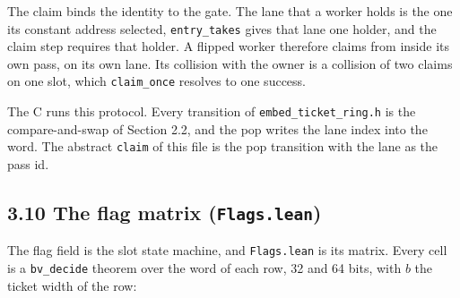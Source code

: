 The claim binds the identity to the gate. The lane that a worker holds is the one its constant address selected, \texttt{entry\_\allowbreak{}takes} gives that lane one holder, and the claim step requires that holder. A flipped worker therefore claims from inside its own pass, on its own lane. Its collision with the owner is a collision of two claims on one slot, which \texttt{claim\_\allowbreak{}once} resolves to one success.

The C runs this protocol. Every transition of \texttt{embed\_\allowbreak{}ticket\_\allowbreak{}ring.\allowbreak{}h} is the compare-and-swap of Section 2.2, and the pop writes the lane index into the word. The abstract \texttt{claim} of this file is the pop transition with the lane as the pass id.

\subsection{\texorpdfstring{3.10 The flag matrix (\texttt{Flags.\allowbreak{}lean})}{3.10 The flag matrix (Flags.lean)}}

The flag field is the slot state machine, and \texttt{Flags.\allowbreak{}lean} is its matrix. Every cell is a \texttt{bv\_\allowbreak{}decide} theorem over the word of each row, 32 and 64 bits, with \(b\) the ticket width of the row:

